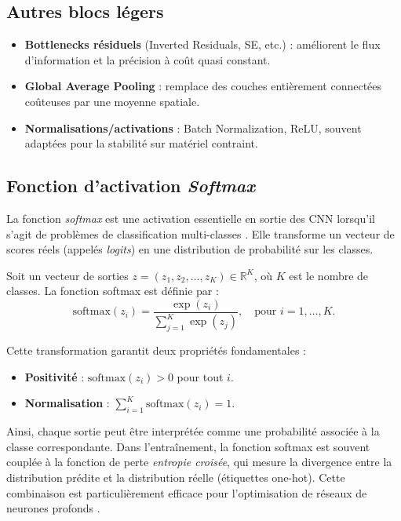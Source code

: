 \subsection{Autres blocs légers}
\begin{itemize}
    \item \textbf{Bottlenecks résiduels} (Inverted Residuals, SE, etc.) : améliorent le flux d’information et la précision à coût quasi constant.
    \item \textbf{Global Average Pooling} : remplace des couches entièrement connectées coûteuses par une moyenne spatiale.
    \item \textbf{Normalisations/activations} : Batch Normalization, ReLU, souvent adaptées pour la stabilité sur matériel contraint.
\end{itemize}

\subsection{Fonction d’activation \textit{Softmax}}
La fonction \textit{softmax} est une activation essentielle en sortie des CNN lorsqu’il s’agit de problèmes de classification multi-classes \cite{goodfellow2016deep, bishop2006pattern}. Elle transforme un vecteur de scores réels (appelés \emph{logits}) en une distribution de probabilité sur les classes.

Soit un vecteur de sorties $z = (z_1, z_2, \dots, z_K) \in \mathbb{R}^K$, où $K$ est le nombre de classes. La fonction softmax est définie par :
\begin{equation}
    \label{eq:softmax}
    \mathrm{softmax}(z_i) = \frac{\exp(z_i)}{\sum_{j=1}^{K} \exp(z_j)}, \quad \text{pour } i = 1, \dots, K.
\end{equation}

Cette transformation garantit deux propriétés fondamentales :
\begin{itemize}
    \item \textbf{Positivité} : $\mathrm{softmax}(z_i) > 0$ pour tout $i$.
    \item \textbf{Normalisation} : $\sum_{i=1}^{K} \mathrm{softmax}(z_i) = 1$.
\end{itemize}

Ainsi, chaque sortie peut être interprétée comme une probabilité associée à la classe correspondante. Dans l’entraînement, la fonction softmax est souvent couplée à la fonction de perte \emph{entropie croisée}, qui mesure la divergence entre la distribution prédite et la distribution réelle (étiquettes one-hot). Cette combinaison est particulièrement efficace pour l’optimisation de réseaux de neurones profonds \cite{goodfellow2016deep}.


